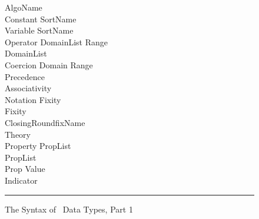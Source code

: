 \begin{figure}[htbp]
\begin{center}
\begin{minipage}{6in}
\begin{tabbing}
{  \galt {} \galt {}} \ts{=} {\vs AlgoName} \\
{\vs Constant} \>  \ts{:} {\vs SortName} \\
{\vs Variable} \>  \ts{:} {\vs SortName} \\
{\vs Operator} \>  \ts{:} {\vs DomainList} \ts{->} {\vs Range} \\
{\vs DomainList} \>   \galt \gepsilon \\
{\vs Coercion} \>  \ts{:} {\vs Domain} \ts{->} {\vs Range} \\
{\vs Precedence} \>   \\
{\vs Associativity} \>  \ts{:} 
   \\
{\vs Notation} \>  \ts{:} {\vs Fixity} \\
{\vs Fixity} \> \gprod {} \galt {} \galt {} \galt {} \\
  \>\> \galt {} \galt {} \galt {} {\vs ClosingRoundfixName} \\
{\vs Theory} \>  \ts{:}  \\
{\vs Property} \>  \ts{:} {\vs PropList} \\
{\vs PropList} \>   \\
{\vs Prop} \>  \ts{=} {\vs Value} \\
{\vs Indicator} \> \gprod {} \galt {} \galt {} \galt {}
   \galt {} \galt {} \\
\end{tabbing}
\end{minipage}

\noindent
\rule{\textwidth}{0.6pt}
\caption{The Syntax of \redux\  Data Types, Part 1}
\label{dtgram1}
\end{center}
\end{figure}
